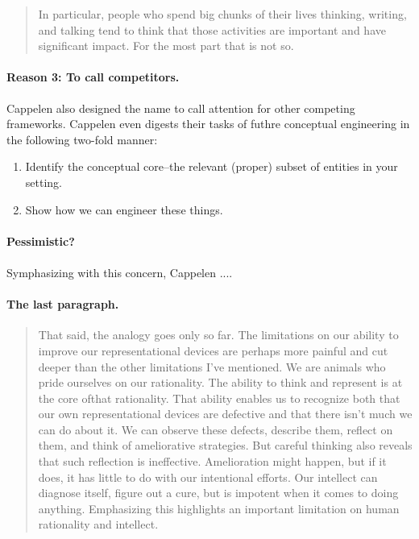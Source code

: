 \documentclass[
10pt, %
a4paper, %
twocolumn, %
landscape %
]{article}
\begin{document}
\begin{quote}
  In particular, people who spend big chunks of their lives thinking, writing, and talking tend to think that those activities are important and have significant impact. For the most part that is not so.
\end{quote}

\paragraph{Reason 3: To call competitors.}
Cappelen also designed the name to call attention for other competing frameworks.
Cappelen even digests their tasks of futhre conceptual engineering in the following two-fold manner:

\begin{enumerate}
  \item Identify the conceptual core--the relevant (proper) subset of entities in your setting.
  \item Show how we can engineer these things.
\end{enumerate}

\paragraph{Pessimistic?}

\paragraph{}
Symphasizing with this concern, Cappelen ....

\paragraph{The last paragraph.}
\begin{quotation}
  That said, the analogy goes only so far. The limitations on our ability to improve our representational devices are perhaps more painful and cut deeper than the other limitations I've mentioned. We are animals who pride ourselves on our rationality. The ability to think and represent is at the core ofthat rationality. That ability enables us to recognize both that our own representational devices are defective and that there isn't much we can do about it. We can observe these defects, describe them, reflect on them, and think of ameliorative strategies. But careful thinking also reveals that such reflection is ineffective. Amelioration might happen, but if it does, it has little to do with our intentional efforts. Our intellect can diagnose itself, figure out a cure, but is impotent when it comes to doing anything. Emphasizing this highlights an important limitation on human rationality and intellect.
\end{quotation}
\end{document}
